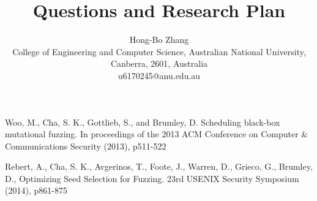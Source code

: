 \documentclass[11pt,note]{HONGBOANU}
\title{Questions and Research Plan}
\author{Hong-Bo Zhang\\
College of Engineering and Computer Science, Australian National University, Canberra, 2601, Australia\\
u6170245@anu.edu.au}
\begin{document}
\newpage




\acknowledgments

\appendix


\begin{thebibliography}{999}

Woo, M., Cha, S. K., Gottlieb, S., and Brumley, D.
Scheduling black-box mutational fuzzing. 
In proceedings of the 2013 ACM Conference on Computer \& Communications Security (2013), p511-522

Rebert, A., Cha, S. K., Avgerinos, T., Foote, J., Warren, D., Grieco, G., Brumley, D.,
Optimizing Seed Selection for Fuzzing.
23rd USENIX Security Symposium (2014), p861-875


\end{thebibliography}
\end{document}
